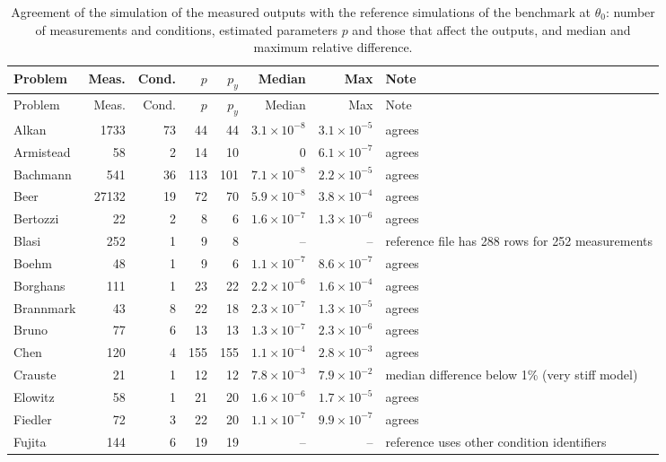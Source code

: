 {\small
\begin{longtable}{@{}>{\raggedright\arraybackslash}p{2.6cm}rrrrrr>{\raggedright\arraybackslash}p{5.3cm}@{}}
\caption{Agreement of the simulation of the measured outputs with the reference simulations of the benchmark at $\theta_0$: number of measurements and conditions, estimated parameters $p$ and those that affect the outputs, and median and maximum relative difference.}\label{tab:simulator}\\
\toprule Problem & Meas. & Cond. & $p$ & $p_y$ & Median & Max & Note \\ \midrule \endfirsthead
\toprule Problem & Meas. & Cond. & $p$ & $p_y$ & Median & Max & Note \\ \midrule \endhead
Alkan & 1733 & 73 & 44 & 44 & $3.1\times10^{-8}$ & $3.1\times10^{-5}$ & agrees \\
Armistead & 58 & 2 & 14 & 10 & $0$ & $6.1\times10^{-7}$ & agrees \\
Bachmann & 541 & 36 & 113 & 101 & $7.1\times10^{-8}$ & $2.2\times10^{-5}$ & agrees \\
Beer & 27132 & 19 & 72 & 70 & $5.9\times10^{-8}$ & $3.8\times10^{-4}$ & agrees \\
Bertozzi & 22 & 2 & 8 & 6 & $1.6\times10^{-7}$ & $1.3\times10^{-6}$ & agrees \\
Blasi & 252 & 1 & 9 & 8 & -- & -- & reference file has 288 rows for 252 measurements \\
Boehm & 48 & 1 & 9 & 6 & $1.1\times10^{-7}$ & $8.6\times10^{-7}$ & agrees \\
Borghans & 111 & 1 & 23 & 22 & $2.2\times10^{-6}$ & $1.6\times10^{-4}$ & agrees \\
Brannmark & 43 & 8 & 22 & 18 & $2.3\times10^{-7}$ & $1.3\times10^{-5}$ & agrees \\
Bruno & 77 & 6 & 13 & 13 & $1.3\times10^{-7}$ & $2.3\times10^{-6}$ & agrees \\
Chen & 120 & 4 & 155 & 155 & $1.1\times10^{-4}$ & $2.8\times10^{-3}$ & agrees \\
Crauste & 21 & 1 & 12 & 12 & $7.8\times10^{-3}$ & $7.9\times10^{-2}$ & median difference below 1\% (very stiff model) \\
Elowitz & 58 & 1 & 21 & 20 & $1.6\times10^{-6}$ & $1.7\times10^{-5}$ & agrees \\
Fiedler & 72 & 3 & 22 & 20 & $1.1\times10^{-7}$ & $9.9\times10^{-7}$ & agrees \\
Fujita & 144 & 6 & 19 & 19 & -- & -- & reference uses other condition identifiers \\

\end{longtable}}

